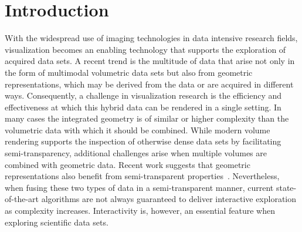 \documentclass{egpubl}
\newcommand{\green}[1]{{\color{PineGreen}#1}}
\newcommand{\new}[1]{\green{#1}}
\newcommand{\todo}[1]{{\color{red}\emph{(#1)}}}
\newcommand{\remark}[1]{{\color{blue!80!white}\textbf{Remark:} #1}}
\newcommand{\ab}{\mbox{A-buffer}}
\begin{document}
\section{Introduction}
\label{sec:introduction}


With the widespread use of imaging technologies in data intensive research fields, visualization becomes an enabling technology that supports the exploration of acquired data sets. 
A recent trend is the multitude of data that arise not only in the form of multimodal volumetric data sets but also from geometric representations, which may be derived from the data or are acquired in different ways.
Consequently, a challenge in visualization research is the efficiency and effectiveness at which this hybrid data can be rendered in a single setting. 
In many cases the integrated geometry is of similar or higher complexity than the volumetric data with which it should be combined. 
While modern volume rendering supports the inspection of otherwise dense data sets by facilitating semi-transparency, additional challenges arise when multiple volumes are combined with geometric data. 
Recent work suggests that geometric representations also benefit from semi-transparent properties~\cite{Guenther:2013:TOG}. 
\new{
Nevertheless, when fusing these two types of data in a semi-transparent manner, current state-of-the-art algorithms are not always guaranteed to deliver interactive exploration as complexity increases.
} 
Interactivity is, however, an essential feature when exploring scientific data sets.
\end{document}
